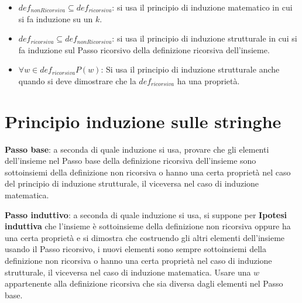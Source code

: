 \begin{itemize}
    \item $def_{nonRicorsiva} \subseteq def_{ricorsiva}$: si usa il principio di induzione matematico in cui si fa induzione su un $k$.
    \item $def_{ricorsiva} \subseteq def_{nonRicorsiva}$: si usa il principio di induzione strutturale in cui si fa induzione sul Passo ricorsivo della definizione ricorsiva dell'insieme.
    \item $\forall w \in def_{ricorsiva} P(w)$: Si usa il principio di induzione strutturale anche quando si deve dimostrare che la $def_{ricorsiva}$ ha una proprietà.
\end{itemize}

\section{Principio induzione sulle stringhe}
\textbf{Passo base}: a seconda di quale induzione si usa, provare che gli elementi dell'insieme nel Passo base della definizione ricorsiva dell'insieme sono sottoinsiemi della definizione non ricorsiva o hanno una certa proprietà nel caso del principio di induzione strutturale, il viceversa nel caso di induzione matematica.

\textbf{Passo induttivo}: a seconda di quale induzione si usa, si suppone per \textbf{Ipotesi induttiva} che l'insieme è sottoinsieme della definizione non ricorsiva oppure ha una certa proprietà e si dimostra che costruendo gli altri elementi dell'insieme usando il Passo ricorsivo, i nuovi elementi sono sempre sottoinsiemi della definizione non ricorsiva o hanno una certa proprietà nel caso di induzione strutturale, il viceversa nel caso di induzione matematica.
Usare una $w$ appartenente alla definizione ricorsiva che sia diversa dagli elementi nel Passo base.

